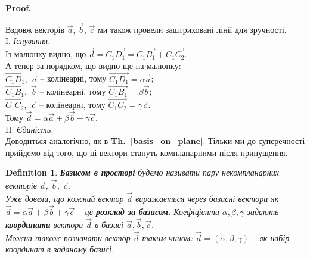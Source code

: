 \documentclass[a4paper, 10pt]{extarticle}
\makeatletter
\def\qed{$\blacksquare$}
\newcommand\thref[1]{\textbf{Th.~\ref{#1}}}
\def\qed{$\blacksquare$}
\theoremstyle{theoremdd}
\theoremstyle{theoremdd}
\newtheorem{definition}[theorem]{Definition}
\theoremstyle{theoremdd}
\theoremstyle{theoremdd}
\theoremstyle{theoremdd}
\theoremstyle{theoremdd}
\theoremstyle{theoremdd}
\theoremstyle{theoremdd}
\renewenvironment{proof}[1][Proof.\\]{\par
\pushQED{\hfill \qed}%
\normalfont \topsep6\p@\@plus6\p@\relax
\trivlist
\item\relax
{\bfseries
#1\@addpunct{.}}\hspace\labelsep\ignorespaces
}{%
\popQED\endtrivlist\@endpefalse
}
\makeatother
\begin{document}
\begin{proof}
\begin{figure}[H]
\end{figure}
	Вздовж векторів $\vec{a}$, $\vec{b}$, $\vec{c}$ ми також провели заштриховані лінії для зручності.\\
	I. \textit{Існування.}\\
	Із малюнку видно, що $\vec{d} = \overrightarrow{C_1D_1} = \overrightarrow{C_1B_1} + \overrightarrow{C_1C_2}$.\\
	А тепер за порядком, що видно ще на малюнку:\\
	$\overrightarrow{C_1D_1},$ $\vec{a}$ -- колінеарні, тому $\overrightarrow{C_1D_1} = \alpha \vec{a}$;\\
	$\overrightarrow{C_1B_1},$ $\vec{b}$ -- колінеарні, тому $\overrightarrow{C_1B_1} = \beta \vec{b}$;\\
	$\overrightarrow{C_1C_2},$ $\vec{c}$ -- колінеарні, тому $\overrightarrow{C_1C_2} = \gamma \vec{c}$.\\
	Тому $\vec{d} = \alpha \vec{a} + \beta \vec{b} + \gamma \vec{c}$.\\
	II. \textit{Єдиність.} \\
	Доводиться аналогічно, як в \thref{basis_on_plane}. Тільки ми до суперечності прийдемо від того, що ці вектори стануть компланарними після припущення.
\end{proof}

\begin{definition}
\textbf{Базисом в просторі} будемо називати  пару некомпланарних векторів $\vec{a}$, $\vec{b}$, $\vec{c}$.\\
Уже довели, що кожний вектор $\vec{d}$ виражається через базисні вектори як $\vec{d} = \alpha \vec{a} + \beta \vec{b} + \gamma \vec{c}$ -- це \textbf{розклад за базисом}. Коефіцієнти $\alpha,\beta,\gamma$ задають \textbf{координати} вектора $\vec{d}$ в базисі $\vec{a},\vec{b},\vec{c}$.
\bigskip \\
Можна також позначати вектор $\vec{d}$ таким чином: $\vec{d} = (\alpha, \beta, \gamma)$ -- як набір координат в заданому базисі.
\end{definition}
\end{document}
